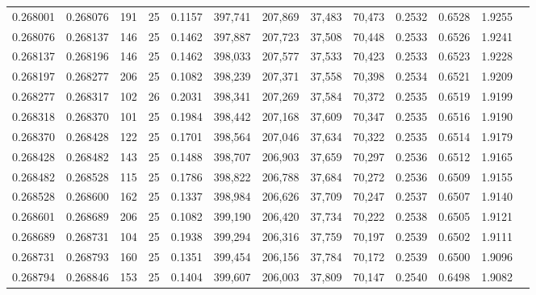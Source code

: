 \begin{tabular}{rrrrrrrrrrrrr}
0.268001 & 0.268076 &   191 &  25 &                                     0.1157 & 397,741 & 207,869 &  37,483 &  70,473 & 0.2532 & 0.6528 & 1.9255 \\
0.268076 & 0.268137 &   146 &  25 &                                     0.1462 & 397,887 & 207,723 &  37,508 &  70,448 & 0.2533 & 0.6526 & 1.9241 \\
0.268137 & 0.268196 &   146 &  25 &                                     0.1462 & 398,033 & 207,577 &  37,533 &  70,423 & 0.2533 & 0.6523 & 1.9228 \\
0.268197 & 0.268277 &   206 &  25 &                                     0.1082 & 398,239 & 207,371 &  37,558 &  70,398 & 0.2534 & 0.6521 & 1.9209 \\
0.268277 & 0.268317 &   102 &  26 &                                     0.2031 & 398,341 & 207,269 &  37,584 &  70,372 & 0.2535 & 0.6519 & 1.9199 \\
0.268318 & 0.268370 &   101 &  25 &                                     0.1984 & 398,442 & 207,168 &  37,609 &  70,347 & 0.2535 & 0.6516 & 1.9190 \\
0.268370 & 0.268428 &   122 &  25 &                                     0.1701 & 398,564 & 207,046 &  37,634 &  70,322 & 0.2535 & 0.6514 & 1.9179 \\
0.268428 & 0.268482 &   143 &  25 &                                     0.1488 & 398,707 & 206,903 &  37,659 &  70,297 & 0.2536 & 0.6512 & 1.9165 \\
0.268482 & 0.268528 &   115 &  25 &                                     0.1786 & 398,822 & 206,788 &  37,684 &  70,272 & 0.2536 & 0.6509 & 1.9155 \\
0.268528 & 0.268600 &   162 &  25 &                                     0.1337 & 398,984 & 206,626 &  37,709 &  70,247 & 0.2537 & 0.6507 & 1.9140 \\
0.268601 & 0.268689 &   206 &  25 &                                     0.1082 & 399,190 & 206,420 &  37,734 &  70,222 & 0.2538 & 0.6505 & 1.9121 \\
0.268689 & 0.268731 &   104 &  25 &                                     0.1938 & 399,294 & 206,316 &  37,759 &  70,197 & 0.2539 & 0.6502 & 1.9111 \\
0.268731 & 0.268793 &   160 &  25 &                                     0.1351 & 399,454 & 206,156 &  37,784 &  70,172 & 0.2539 & 0.6500 & 1.9096 \\
0.268794 & 0.268846 &   153 &  25 &                                     0.1404 & 399,607 & 206,003 &  37,809 &  70,147 & 0.2540 & 0.6498 & 1.9082 \\

\end{tabular}
